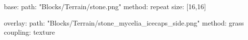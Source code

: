base:
  path: "Blocks/Terrain/stone.png"
  method: repeat
  size: [16,16]

overlay:
  path: "Blocks/Terrain/stone_mycelia_icecaps_side.png"
  method: grass
  coupling: texture